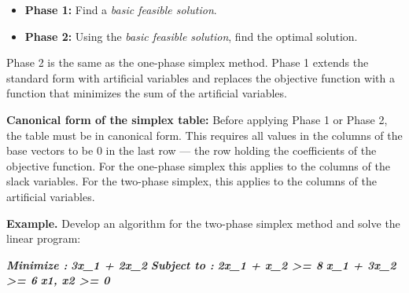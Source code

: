 \documentclass[11pt]{article}
\providecommand{\tightlist}{%
      \setlength{\itemsep}{0pt}\setlength{\parskip}{0pt}}
\newenvironment{Shaded}{}{}
\newcommand{\InformationTok}[1]{\textcolor[rgb]{0.38,0.63,0.69}{\textbf{\textit{{#1}}}}}
\begin{document}
\begin{itemize}
\tightlist
\item
  \textbf{Phase 1:} Find a \emph{basic feasible solution}.
\item
  \textbf{Phase 2:} Using the \emph{basic feasible solution}, find the
  optimal solution.
\end{itemize}

Phase 2 is the same as the one-phase simplex method. Phase 1 extends the
standard form with artificial variables and replaces the objective
function with a function that minimizes the sum of the artificial
variables.

\textbf{Canonical form of the simplex table:} Before applying Phase 1 or
Phase 2, the table must be in canonical form. This requires all values
in the columns of the base vectors to be 0 in the last row --- the row
holding the coefficients of the objective function. For the one-phase
simplex this applies to the columns of the slack variables. For the
two-phase simplex, this applies to the columns of the artificial
variables.

\textbf{Example.} Develop an algorithm for the two-phase simplex method
and solve the linear program:

\begin{Shaded}
\begin{Highlighting}[]
\InformationTok{        Minimize :}
\InformationTok{                     3x\_1 + 2x\_2}
\InformationTok{        Subject to :}
\InformationTok{                     2x\_1 + x\_2 \textgreater{}= 8}
\InformationTok{                     x\_1 + 3x\_2 \textgreater{}= 6}
\InformationTok{                         x1, x2 \textgreater{}= 0}
\end{Highlighting}
\end{Shaded}
\end{document}
